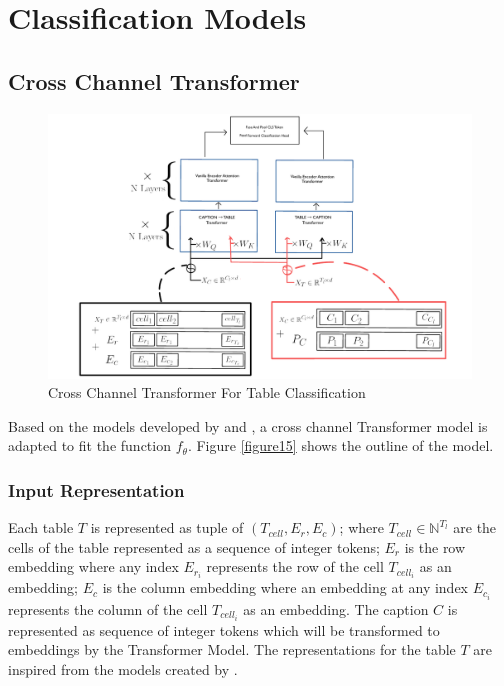 \section{Classification Models}
\label{table_classification:models}

\subsection{Cross Channel Transformer}
\begin{figure}[h]
    \centering
    \includegraphics[width=\maxwidth{\textwidth}]{src/images/tablemodel.pdf}
    \caption{Cross Channel Transformer For Table Classification}
    \label{figure\arabic{figurecounter}}
\end{figure}

Based on the models developed by \cite{deng2020turl} and \cite{tsai2019multimodal}, a cross channel Transformer model is adapted to fit the function $f_\theta$. Figure \ref{figure15} shows the outline of the model.

\subsubsection{Input Representation}
Each table $T$ is represented as tuple of $(T_{cell},E_r,E_c)$; where $T_{cell} \in \mathbb{N}^{T_l}$ are the cells of the table represented as a sequence of integer tokens; $E_r$ is the row embedding where any index $E_{r_{i}}$ represents the row of the cell $T_{cell_{i}}$ as an embedding;  $E_c$ is the column embedding where an embedding at any index $E_{c_{i}}$ represents the column of the cell $T_{cell_{i}}$ as an embedding. The caption $C$ is represented as sequence of integer tokens which will be transformed to embeddings by the Transformer Model. The representations for the table $T$ are inspired from the models created by \cite{deng2020turl}. 

